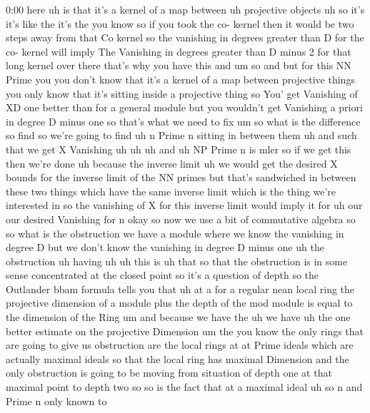 \begin{unfinished}{0:00}
here  uh  is  that  it's  a  kernel  of  a  map
between  uh  projective  objects  uh  so  it's
it's  like  the  it's  the  you  know  so  if
you  took  the  co-  kernel  then  it  would  be
two  steps  away  from  that  Co  kernel  so
the  vanishing  in  degrees  greater  than  D
for  the  co-  kernel  will  imply  The
Vanishing  in  degrees  greater  than  D
minus  2  for  that  long  kernel  over  there
that's  why  you  have  this  and
um  so  and  but  for  this  NN  Prime  you  you
don't  know  that  it's  a  kernel  of  a  map
between  projective  things  you  only  know
that  it's  sitting  inside  a  projective
thing  so  You'  get  Vanishing  of  XD  one
better  than  for  a  general  module  but  you
wouldn't  get  Vanishing  a  priori  in
degree  D  minus  one  so  that's  what  we
need  to  fix
um  so  what  is  the  difference  so  find  so
we're  going  to  find  uh  n  Prime  n  sitting
in  between
them
uh  and  such  that  we  get  X
Vanishing
uh
uh  uh  and  uh  NP  Prime  n  is
mler
so  if  we  get  this  then  we're
done  uh  because  the  inverse  limit  uh  we
would  get  the  desired  X  bounds  for  the
inverse  limit  of  the  NN  primes  but
that's  sandwiched  in  between  these  two
things  which  have  the  same  inverse  limit
which  is  the  thing  we're  interested  in
so  the  vanishing  of  X  for  this  inverse
limit  would  imply  it  for  uh  our  our
desired  Vanishing  for
n
okay
so  now  we  use  a  bit  of  commutative
algebra  so  so  what  is  the  obstruction  we
have  a  module  where  we  know  the
vanishing  in  degree  D  but  we  don't  know
the  vanishing  in  degree  D  minus  one  uh
the
obstruction  uh
having
uh
uh  this
is  uh
that  so  that  the  obstruction  is  in  some
sense  concentrated  at  the  closed  point
so  it's  a  question  of  depth  so  the
Outlander  bbam  formula  tells  you  that  uh
at  a  for  a  regular  nean  local  ring  the
projective  dimension  of  a  module  plus
the  depth  of  the  mod  module  is  equal  to
the  dimension  of  the  Ring  um  and  because
we  have  the  uh  we
have  uh  the  one  better  estimate  on  the
projective  Dimension  um  the  you  know  the
only  rings  that  are  going  to  give  us
obstruction  are  the  local  rings  at  at
Prime  ideals  which  are  actually  maximal
ideals  so  that  the  local  ring  has
maximal  Dimension  and  the  only
obstruction  is  going  to  be  moving  from
situation  of  depth  one  at  that  maximal
point  to  depth  two  so  so  is  the  fact
that
at  a  maximal
ideal  uh  so  n  and  Prime  n  only  known  to

\end{unfinished}
